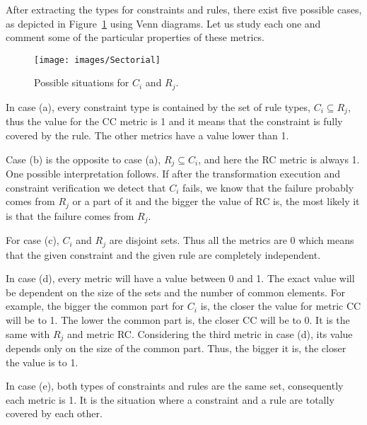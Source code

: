 After extracting the types for constraints and rules, there exist five possible cases, as depicted in Figure~\ref{fig:Sectorial} using Venn diagrams. Let us study each one and comment some of the particular properties of these metrics.


\begin{figure}[h!]
\centering
\texttt{[image: images/Sectorial]}
\caption{Possible situations for $C_{i}$ and $R_{j}$.}
\label{fig:Sectorial}
\end{figure}


In case (a), every constraint type is contained by the set of rule types, $C_{i} \subseteq R_{j}$, thus the value for the CC metric is 1 and it means that the constraint is fully covered by the rule. The other metrics have a value lower than 1.

Case (b) is the opposite to case (a), $R_{j} \subseteq C_{i}$, and here the RC metric is always 1. One possible interpretation follows. If after the transformation execution and constraint verification we detect that $C_{i}$ fails, we know that the failure probably comes from $R_{j}$ or a part of it and the bigger the value of RC is, the most likely it is that the failure comes from $R_{j}$.

For case (c), $C_{i}$ and $R_{j}$ are disjoint sets. Thus all the metrics are 0 which means that the given constraint and the given rule are completely independent.

In case (d), every metric will have a value between 0 and 1. The exact value will be dependent on the size of the sets and the number of common elements. For example, the bigger the common part for $C_{i}$ is, the closer the value for metric CC will be to 1. The lower the common part is, the closer CC will be to 0. It is the same with $R_{j}$ and metric RC. Considering the third metric in case (d), its value depends only on the size of the common part. Thus, the bigger it is, the closer the value is to 1.

In case (e), both types of constraints and rules are the same set, consequently each metric is 1. It is the situation where a constraint and a rule are totally covered by each other.


